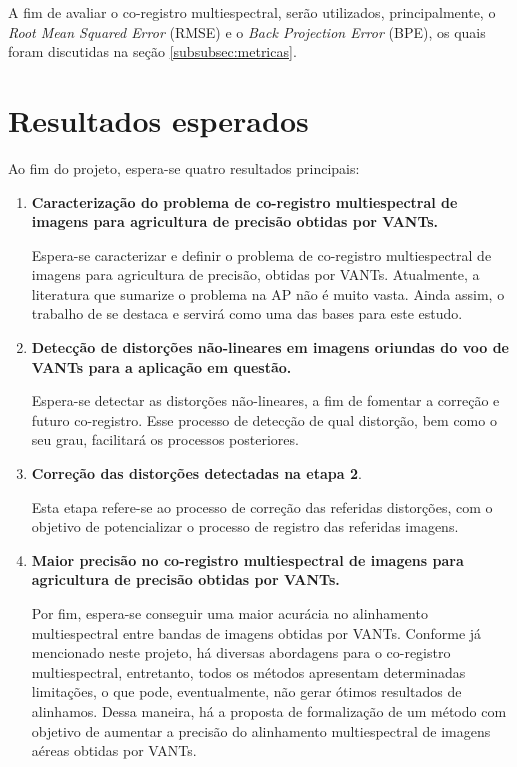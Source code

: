 \documentclass[12pt]{article}
\begin{document}
A fim de avaliar o co-registro multiespectral, serão utilizados, principalmente, o \textit{Root Mean Squared Error} (RMSE) e o \textit{Back Projection Error} (BPE), os quais foram discutidas na seção \ref{subsubsec:metricas}. 

\section{Resultados esperados} 
\label{sec:resultados}

Ao fim do projeto, espera-se quatro resultados principais:

\begin{enumerate}
    \item \textbf{Caracterização do problema de co-registro multiespectral de imagens para agricultura de precisão obtidas por VANTs.} 
    
    Espera-se caracterizar e definir o problema de co-registro multiespectral de imagens para agricultura de precisão, obtidas por VANTs. Atualmente, a literatura que sumarize o problema na AP não é muito vasta. Ainda assim, o trabalho de \cite{junior2019detection} se destaca e servirá como uma das bases para este estudo.
    
    \item \textbf{Detecção de distorções não-lineares em imagens oriundas do voo de VANTs para a aplicação em questão.} 
    
    Espera-se detectar as distorções não-lineares, a fim de fomentar a correção e futuro co-registro. Esse processo de detecção de qual distorção, bem como o seu grau, facilitará os processos posteriores.
    
    \item \textbf{Correção das distorções detectadas na etapa 2}.
    
    Esta etapa refere-se ao processo de correção das referidas distorções, com o objetivo de potencializar o processo de registro das referidas imagens.
    
    \item \textbf{Maior precisão no co-registro multiespectral de imagens para agricultura de precisão obtidas por VANTs.} 
    
    Por fim, espera-se conseguir uma maior acurácia no alinhamento multiespectral entre bandas de imagens obtidas por VANTs. Conforme já mencionado neste projeto, há diversas abordagens para o co-registro multiespectral, entretanto, todos os métodos apresentam determinadas limitações, o que pode, eventualmente, não gerar ótimos resultados de alinhamos. Dessa maneira, há a proposta de formalização de um método com objetivo de aumentar a precisão do alinhamento multiespectral de imagens aéreas obtidas por VANTs.
    
\end{enumerate}
\end{document}
